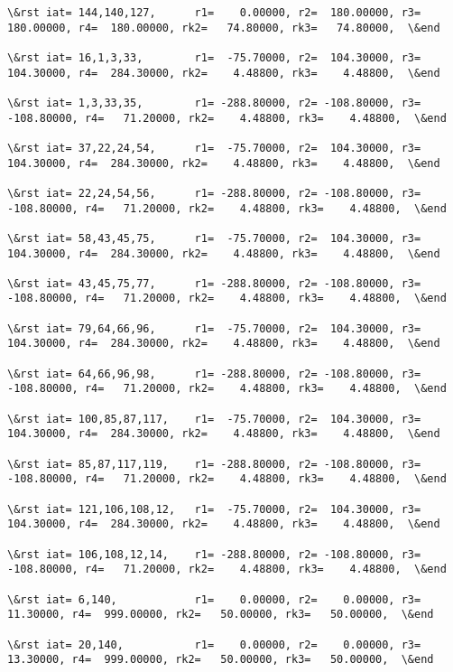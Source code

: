 \documentclass[11pt]{article}
\begin{document}
\begin{Verbatim}[commandchars=\\\{\}]
\&rst iat= 144,140,127,      r1=    0.00000, r2=  180.00000, r3=  180.00000, r4=  180.00000, rk2=   74.80000, rk3=   74.80000,  \&end

\&rst iat= 16,1,3,33,        r1=  -75.70000, r2=  104.30000, r3=  104.30000, r4=  284.30000, rk2=    4.48800, rk3=    4.48800,  \&end

\&rst iat= 1,3,33,35,        r1= -288.80000, r2= -108.80000, r3= -108.80000, r4=   71.20000, rk2=    4.48800, rk3=    4.48800,  \&end

\&rst iat= 37,22,24,54,      r1=  -75.70000, r2=  104.30000, r3=  104.30000, r4=  284.30000, rk2=    4.48800, rk3=    4.48800,  \&end

\&rst iat= 22,24,54,56,      r1= -288.80000, r2= -108.80000, r3= -108.80000, r4=   71.20000, rk2=    4.48800, rk3=    4.48800,  \&end

\&rst iat= 58,43,45,75,      r1=  -75.70000, r2=  104.30000, r3=  104.30000, r4=  284.30000, rk2=    4.48800, rk3=    4.48800,  \&end

\&rst iat= 43,45,75,77,      r1= -288.80000, r2= -108.80000, r3= -108.80000, r4=   71.20000, rk2=    4.48800, rk3=    4.48800,  \&end

\&rst iat= 79,64,66,96,      r1=  -75.70000, r2=  104.30000, r3=  104.30000, r4=  284.30000, rk2=    4.48800, rk3=    4.48800,  \&end

\&rst iat= 64,66,96,98,      r1= -288.80000, r2= -108.80000, r3= -108.80000, r4=   71.20000, rk2=    4.48800, rk3=    4.48800,  \&end

\&rst iat= 100,85,87,117,    r1=  -75.70000, r2=  104.30000, r3=  104.30000, r4=  284.30000, rk2=    4.48800, rk3=    4.48800,  \&end

\&rst iat= 85,87,117,119,    r1= -288.80000, r2= -108.80000, r3= -108.80000, r4=   71.20000, rk2=    4.48800, rk3=    4.48800,  \&end

\&rst iat= 121,106,108,12,   r1=  -75.70000, r2=  104.30000, r3=  104.30000, r4=  284.30000, rk2=    4.48800, rk3=    4.48800,  \&end

\&rst iat= 106,108,12,14,    r1= -288.80000, r2= -108.80000, r3= -108.80000, r4=   71.20000, rk2=    4.48800, rk3=    4.48800,  \&end

\&rst iat= 6,140,            r1=    0.00000, r2=    0.00000, r3=   11.30000, r4=  999.00000, rk2=   50.00000, rk3=   50.00000,  \&end

\&rst iat= 20,140,           r1=    0.00000, r2=    0.00000, r3=   13.30000, r4=  999.00000, rk2=   50.00000, rk3=   50.00000,  \&end


\end{Verbatim}
\end{document}
